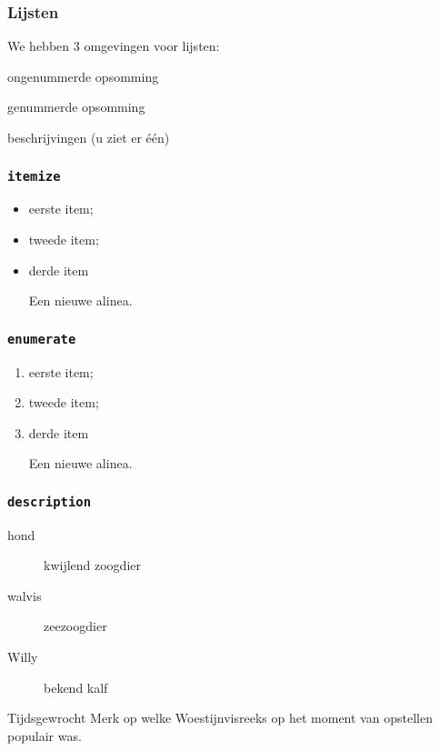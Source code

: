 \begin{frame}
  \frametitle{Lijsten}

  We hebben 3 omgevingen voor lijsten:
  \begin{description}
  	\item[\texttt{itemize}] ongenummerde opsomming
  	\item[\texttt{enumerate}] genummerde opsomming
  	\item[\texttt{description}] beschrijvingen (u ziet er \'e\'en)
  \end{description}
\end{frame}

\begin{frame}[fragile]
  \frametitle{\texttt{itemize}}

  \begin{LTXexample}
\begin{itemize}
  \item eerste item;
  \item tweede item;
  \item derde item

    Een nieuwe alinea.
\end{itemize}
  \end{LTXexample}
\end{frame}

\begin{frame}[fragile]
  \frametitle{\texttt{enumerate}}

  \begin{LTXexample}
\begin{enumerate}
  \item eerste item;
  \item tweede item;
  \item derde item

    Een nieuwe alinea.
\end{enumerate}
  \end{LTXexample}
\end{frame}

\begin{frame}[fragile]
  \frametitle{\texttt{description}}

  \begin{LTXexample}
\begin{description}
  \item[hond] kwijlend zoogdier
  \item[walvis] zeezoogdier
  \item[Willy] bekend kalf
\end{description}
  \end{LTXexample}

  \pause\begin{exampleblock}{Tijdsgewrocht}
    Merk op welke Woestijnvisreeks op het moment van opstellen populair was.
  \end{exampleblock}
\end{frame}

